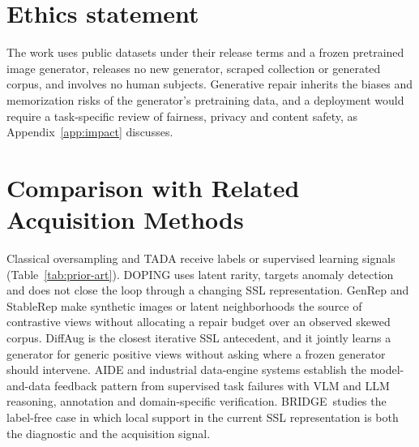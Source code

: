 \documentclass{article}
\newcommand{\method}{BRIDGE}
\begin{document}
\section*{Ethics statement}
The work uses public datasets under their release terms and a frozen pretrained image generator, releases no new generator, scraped collection or generated corpus, and involves no human subjects. Generative repair inherits the biases and memorization risks of the generator's pretraining data, and a deployment would require a task-specific review of fairness, privacy and content safety, as Appendix~\ref{app:impact} discusses.




\appendix

\section{Comparison with Related Acquisition Methods}
\label{app:prior-art}
Classical oversampling and TADA receive labels or supervised learning signals (Table~\ref{tab:prior-art}). DOPING uses latent rarity, targets anomaly detection and does not close the loop through a changing SSL representation. GenRep and StableRep make synthetic images or latent neighborhoods the source of contrastive views without allocating a repair budget over an observed skewed corpus. DiffAug is the closest iterative SSL antecedent, and it jointly learns a generator for generic positive views without asking where a frozen generator should intervene. AIDE and industrial data-engine systems establish the model-and-data feedback pattern from supervised task failures with VLM and LLM reasoning, annotation and domain-specific verification. \method\ studies the label-free case in which local support in the current SSL representation is both the diagnostic and the acquisition signal.
\end{document}
